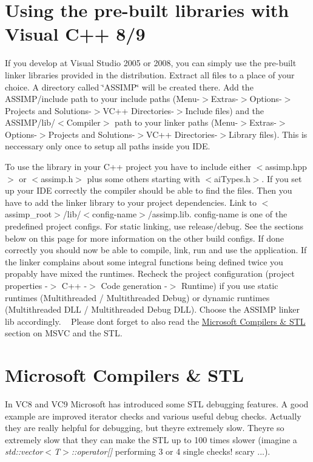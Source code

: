 \hypertarget{install_install_prebuilt}{}\section{Using the pre-\/built libraries with Visual C++ 8/9}\label{install_install_prebuilt}
If you develop at Visual Studio 2005 or 2008, you can simply use the pre-\/built linker libraries provided in the distribution. Extract all files to a place of your choice. A directory called \char`\"{}\+A\+S\+S\+I\+M\+P\char`\"{} will be created there. Add the A\+S\+S\+I\+M\+P/include path to your include paths (Menu-\/$>$Extras-\/$>$Options-\/$>$Projects and Solutions-\/$>$V\+C++ Directories-\/$>$Include files) and the A\+S\+S\+I\+M\+P/lib/$<$Compiler$>$ path to your linker paths (Menu-\/$>$Extras-\/$>$Options-\/$>$Projects and Solutions-\/$>$V\+C++ Directories-\/$>$Library files). This is neccessary only once to setup all paths inside you I\+D\+E.

To use the library in your C++ project you have to include either $<$assimp.\+hpp$>$ or $<$assimp.\+h$>$ plus some others starting with $<$ai\+Types.\+h$>$. If you set up your I\+D\+E correctly the compiler should be able to find the files. Then you have to add the linker library to your project dependencies. Link to $<$assimp\+\_\+root$>$/lib/$<$config-\/name$>$/assimp.lib. config-\/name is one of the predefined project configs. For static linking, use release/debug. See the sections below on this page for more information on the other build configs. If done correctly you should now be able to compile, link, run and use the application. If the linker complains about some integral functions being defined twice you propably have mixed the runtimes. Recheck the project configuration (project properties -\/$>$ C++ -\/$>$ Code generation -\/$>$ Runtime) if you use static runtimes (Multithreaded / Multithreaded Debug) or dynamic runtimes (Multithreaded D\+L\+L / Multithreaded Debug D\+L\+L). Choose the A\+S\+S\+I\+M\+P linker lib accordingly. ~\newline
 Please don\textquotesingle{}t forget to also read the \hyperlink{install_assimp_stl}{Microsoft Compilers \& S\+T\+L} section on M\+S\+V\+C and the S\+T\+L.\hypertarget{install_assimp_stl}{}\section{Microsoft Compilers \& S\+T\+L}\label{install_assimp_stl}
In V\+C8 and V\+C9 Microsoft has introduced some S\+T\+L debugging features. A good example are improved iterator checks and various useful debug checks. Actually they are really helpful for debugging, but they\textquotesingle{}re extremely slow. They\textquotesingle{}re so extremely slow that they can make the S\+T\+L up to 100 times slower (imagine a {\itshape std\+::vector$<$\+T$>$\+::operator\mbox{[}\mbox{]} } performing 3 or 4 single checks! scary ...).


